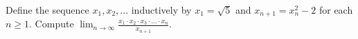 Define the sequence $x_1, x_2, ...$ inductively by $x_1 = \sqrt{5}$ and $x_{n+1} = x_n^2 - 2$ for each $n \geq 1$. Compute
$\lim_{n \to \infty} \frac{x_1 \cdot x_2 \cdot x_3 \cdot ... \cdot x_n}{x_{n+1}}$.